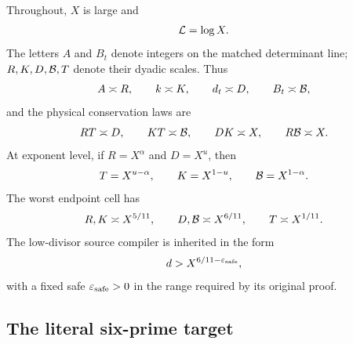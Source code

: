 Throughout, $X$ is large and
\[
                 \mathcal L=\log X.
\]
The letters $A$ and $B_t$ denote integers on the matched determinant line;
$R,K,D,\mathcal B,T$ denote their dyadic scales.  Thus
\begin{equation}\label{eq:scale-ledger}
 A\asymp R,\qquad k\asymp K,\qquad d_t\asymp D,
 \qquad B_t\asymp\mathcal B,
\end{equation}
and the physical conservation laws are
\begin{equation}\label{eq:conservation-laws}
          RT\asymp D,
 \qquad KT\asymp\mathcal B,
 \qquad DK\asymp X,
 \qquad R\mathcal B\asymp X.
\end{equation}
At exponent level, if $R=X^\alpha$ and $D=X^u$, then
\[
        T=X^{u-\alpha},\qquad K=X^{1-u},
        \qquad \mathcal B=X^{1-\alpha}.
\]
The worst endpoint cell has
\[
 R,K\asymp X^{5/11},\qquad D,\mathcal B\asymp X^{6/11},
 \qquad T\asymp X^{1/11}.
\]
The low-divisor source compiler is inherited in the form
\begin{equation}\label{eq:lowd-cutoff}
             d>X^{6/11-\varepsilon_{\mathrm{safe}}},
\end{equation}
with a fixed safe $\varepsilon_{\mathrm{safe}}>0$ in the range required by its original proof.

\subsection{The literal six-prime target}

